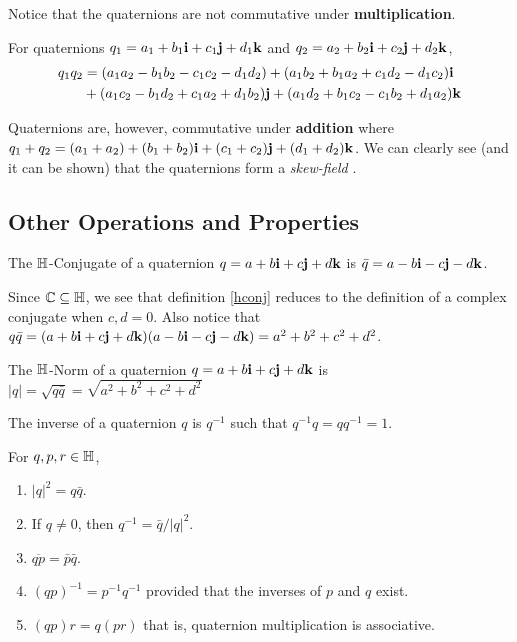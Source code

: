 Notice that the quaternions are not commutative under \textbf{multiplication}. 
\begin{theorem}
	For quaternions $q_1 = a_1 + b_1\textbf{i} + c_1\textbf{j} + d_1\textbf{k}$ and $q_2 = a_2 + b_2\textbf{i} + c_2\textbf{j} + d_2\textbf{k}$, 
	\begin{align*}
		q_1q_2 &= (a_1a_2 - b_1b_2 - c_1c_2 - d_1d_2) + (a_1b_2 + b_1a_2 + c_1d_2 - d_1c_2)\textbf{i} \\
			   &+ (a_1c_2 - b_1d_2 + c_1a_2 + d_1b_2)\textbf{j} + (a_1d_2 + b_1c_2 - c_1b_2 + d_1a_2)\textbf{k}
	\end{align*}
\end{theorem}

Quaternions are, however, commutative under \textbf{addition} where $q_1+q_2 = (a_1+a_2) + (b_1+b_2)\textbf{i} + (c_1+c_2)\textbf{j} + (d_1+d_2)\textbf{k}$. We can clearly see (and it can be shown) that the quaternions form a \emph{skew-field} \cite{aslaksen} \cite{brenner}. 

\subsection{Other Operations and Properties}

\begin{definition}[$\HH$-Conjugate] \label{hconj}
	The $\HH$-Conjugate of a quaternion $q = a + b\textbf{i} + c\textbf{j} + d\textbf{k}$ is $\bar{q} = a - b\textbf{i} - c\textbf{j} - d\textbf{k}$.
\end{definition}
	
	Since $\operatorname{\mathbb{C}} \subseteq \operatorname{\mathbb{H}}$, we see that definition \ref{hconj} reduces to the definition of a complex conjugate when $c,d = 0$. Also notice that $q\bar{q} = (a + b\textbf{i} + c\textbf{j} + d\textbf{k})(a - b\textbf{i} -c\textbf{j}-d\textbf{k}) = a^2+b^2+c^2+d^2$.

\begin{definition}[$\HH$-Norm]
	The $\HH$-Norm of a quaternion $q = a + b\textbf{i} + c\textbf{j} + d\textbf{k}$ is $|q| = \sqrt{q\bar{q}} = \sqrt{a^2+b^2+c^2+d^2}$
\end{definition}

\begin{definition}[Inverse]
	The inverse of a quaternion $q$ is $q^{-1}$ such that $q^{-1}q = qq^{-1} = 1$.
\end{definition}

\begin{theorem}
For $q, p, r \in \operatorname{\mathbb{H}}$,
	\begin{enumerate}
		\item $|q|^2 = q\bar{q}$.
		\item If $q\neq 0$, then $q^{-1} = \bar{q}/|q|^2$.
		\item $\overline{qp} = \bar{p}\bar{q}$.
		\item $(qp)^{-1} = p^{-1}q^{-1}$ provided that the inverses of $p$ and $q$ exist.
		\item $(qp)r = q(pr)$ that is, quaternion multiplication is associative.
	\end{enumerate}
\end{theorem}

